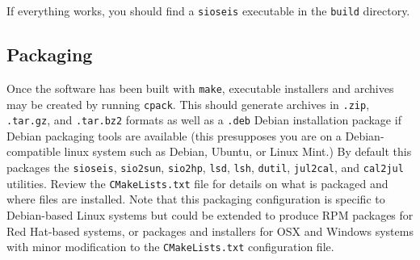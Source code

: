 If everything works, you should find a \texttt{sioseis} executable in the
\texttt{build} directory.

\subsection{Packaging}

Once the software has been built with \texttt{make}, executable installers and
archives may be created by running \texttt{cpack}. This should generate
archives in \texttt{.zip}, \texttt{.tar.gz}, and \texttt{.tar.bz2} formats as
well as a \texttt{.deb} Debian installation package if Debian packaging tools
are available (this presupposes you are on a Debian-compatible linux system
such as Debian, Ubuntu, or Linux Mint.) By default this packages the
\texttt{sioseis}, \texttt{sio2sun}, \texttt{sio2hp}, \texttt{lsd},
\texttt{lsh}, \texttt{dutil}, \texttt{jul2cal}, and \texttt{cal2jul} utilities.
Review the \texttt{CMakeLists.txt} file for details on what is packaged and
where files are installed. Note that this packaging configuration is specific
to Debian-based Linux systems but could be extended to produce RPM packages for
Red Hat-based systems, or packages and installers for OSX and Windows systems
with minor modification to the \texttt{CMakeLists.txt} configuration file.




